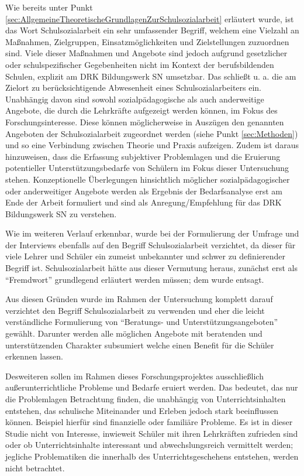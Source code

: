 Wie bereits unter Punkt \ref{sec:AllgemeineTheoretischeGrundlagenZurSchulsozialarbeit} erläutert wurde, ist das Wort Schulsozialarbeit ein sehr umfassender Begriff, welchem eine Vielzahl an Maßnahmen, Zielgruppen, Einsatzmöglichkeiten und Zielstellungen zuzuordnen sind. Viele dieser Maßnahmen und Angebote sind jedoch aufgrund gesetzlicher oder schulspezifischer Gegebenheiten nicht im Kontext der berufsbildenden Schulen, explizit am DRK Bildungswerk SN umsetzbar. Das schließt u. a. die am Zielort zu berücksichtigende Abwesenheit eines Schulsozialarbeiters ein. Unabhängig davon sind sowohl sozialpädagogische als auch anderweitige Angebote, die durch die Lehrkräfte aufgezeigt werden können, im Fokus des Forschungsinteresse. Diese können möglicherweise in Auszügen den genannten Angeboten der Schulsozialarbeit zugeordnet werden (siehe Punkt \ref{sec:Methoden}) und so eine Verbindung zwischen Theorie und Praxis aufzeigen. Zudem ist daraus hinzuweisen, dass die Erfassung subjektiver Problemlagen und die Eruierung potentieller Unterstützungsbedarfe von Schülern im Fokus dieser Untersuchung stehen. Konzeptionelle Überlegungen hinsichtlich möglicher sozialpädagogischer oder anderweitiger Angebote werden als Ergebnis der Bedarfsanalyse erst am Ende der Arbeit formuliert und sind als Anregung/Empfehlung für das DRK Bildungswerk SN zu verstehen.
 
Wie im weiteren Verlauf erkennbar, wurde bei der Formulierung der Umfrage und der Interviews ebenfalls auf den Begriff Schulsozialarbeit verzichtet, da dieser für viele Lehrer und Schüler ein zumeist unbekannter und schwer zu definierender Begriff ist. Schulsozialarbeit hätte aus dieser Vermutung heraus, zunächst erst als "`Fremdwort"' grundlegend erläutert werden müssen; dem wurde entsagt.

Aus diesen Gründen wurde im Rahmen der Untersuchung komplett darauf verzichtet den Begriff Schulsozialarbeit zu verwenden und eher die leicht verständliche Formulierung von "`Beratungs- und Unterstützungsangeboten"' gewählt. Darunter werden alle möglichen Angebote mit beratenden und unterstützenden Charakter subsumiert welche einen Benefit für die Schüler erkennen lassen.

Desweiteren sollen im Rahmen dieses Forschungsprojektes ausschließlich außerunterrichtliche Probleme und Bedarfe eruiert werden. Das bedeutet, das nur die Problemlagen Betrachtung finden, die unabhängig von Unterrichtsinhalten entstehen, das schulische Miteinander und Erleben jedoch stark beeinflussen können. Beispiel hierfür sind finanzielle oder familiäre Probleme. Es ist in dieser Studie nicht von Interesse, inwieweit Schüler mit ihren Lehrkräften zufrieden sind oder ob Unterrichtsinhalte interessant und abwechslungsreich vermittelt werden; jegliche Problematiken die innerhalb des Unterrichtsgeschehens entstehen, werden nicht betrachtet. 

